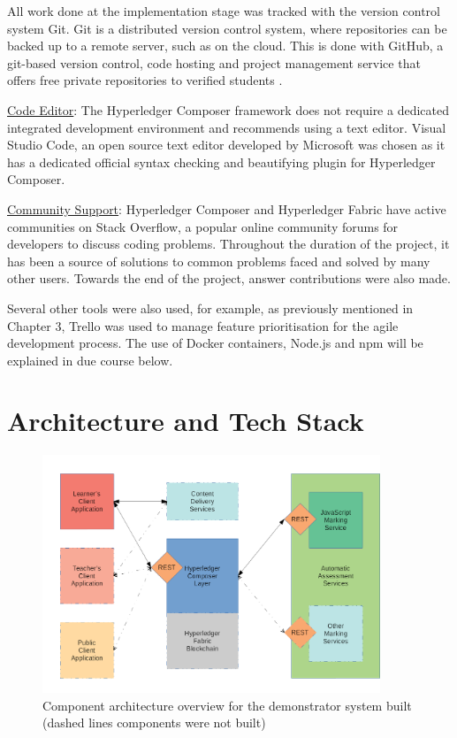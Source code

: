 All work done at the implementation stage was tracked with the version control system Git.
Git is a distributed version control system, where repositories can be backed up to a remote server,
such as on the cloud. This is done with GitHub, a git-based version control, code hosting and
project management service that offers free private repositories to verified students \citep{github2018education}.

\underline{Code Editor}: The Hyperledger Composer framework does not require a dedicated integrated
development environment and recommends using a text editor. Visual Studio Code, an open source text editor developed
by Microsoft was chosen as it has a dedicated official syntax checking and beautifying plugin for Hyperledger Composer.

\underline{Community Support}: Hyperledger Composer and Hyperledger Fabric have active communities on Stack Overflow,
a popular online community forums for developers to discuss coding problems. Throughout the duration of the project,
it has been a source of solutions to common problems faced and solved by many other users. Towards the end of the project,
answer contributions were also made.

Several other tools were also used, for example, as previously mentioned in Chapter 3, Trello was used to manage
feature prioritisation for the agile development process. The use of Docker containers, Node.js and npm 
will be explained in due course below.

\section{Architecture and Tech Stack}

\begin{figure}[!ht]
	\centering
	\includegraphics[width=0.9\textwidth]{architecture}
	\caption[Demonstrator Component Architecture]
	{Component architecture overview for the demonstrator system built (dashed lines components were not built)}
	\label{fig:architecture}
\end{figure}

